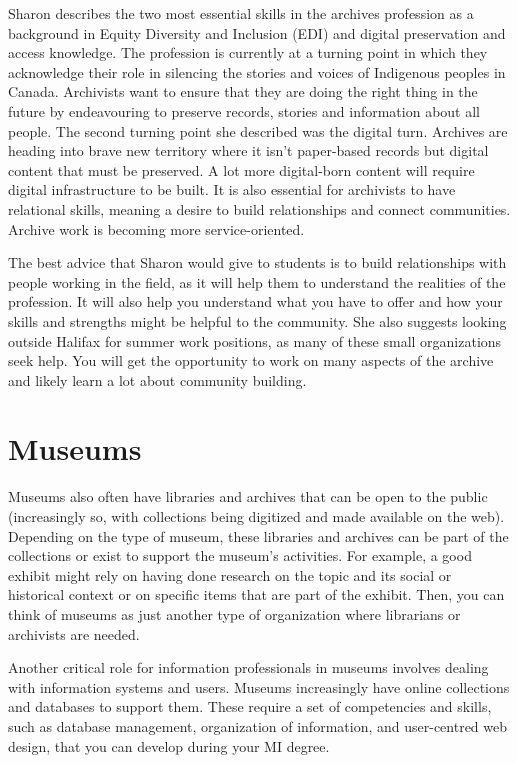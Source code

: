 \documentclass[
  letterpaper,
  DIV=11,
  numbers=noendperiod]{scrreprt}
\begin{document}
\begin{tcolorbox}
Sharon describes the two most essential skills in the archives
profession as a background in Equity Diversity and Inclusion (EDI) and
digital preservation and access knowledge. The profession is currently
at a turning point in which they acknowledge their role in silencing the
stories and voices of Indigenous peoples in Canada. Archivists want to
ensure that they are doing the right thing in the future by endeavouring
to preserve records, stories and information about all people. The
second turning point she described was the digital turn. Archives are
heading into brave new territory where it isn't paper-based records but
digital content that must be preserved. A lot more digital-born content
will require digital infrastructure to be built. It is also essential
for archivists to have relational skills, meaning a desire to build
relationships and connect communities. Archive work is becoming more
service-oriented.

The best advice that Sharon would give to students is to build
relationships with people working in the field, as it will help them to
understand the realities of the profession. It will also help you
understand what you have to offer and how your skills and strengths
might be helpful to the community. She also suggests looking outside
Halifax for summer work positions, as many of these small organizations
seek help. You will get the opportunity to work on many aspects of the
archive and likely learn a lot about community building.

\end{tcolorbox}

\section{Museums}\label{museums}

Museums also often have libraries and archives that can be open to the
public (increasingly so, with collections being digitized and made
available on the web). Depending on the type of museum, these libraries
and archives can be part of the collections or exist to support the
museum's activities. For example, a good exhibit might rely on having
done research on the topic and its social or historical context or on
specific items that are part of the exhibit. Then, you can think of
museums as just another type of organization where librarians or
archivists are needed.

Another critical role for information professionals in museums involves
dealing with information systems and users. Museums increasingly have
online collections and databases to support them. These require a set of
competencies and skills, such as database management, organization of
information, and user-centred web design, that you can develop during
your MI degree.
\end{document}
